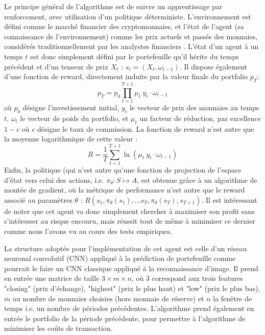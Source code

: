 \documentclass[a4paper, 10pt]{article}
\begin{document}
Le principe général de l'algorithme est de suivre un apprentissage par renforcement, avec utilisation d'un politique déterministe. L'environnement est défini comme le marché financier des cryptomonnaies, et l'état de l'agent (sa connaissance de l'environnement) comme les prix actuels et passés des monnaies, considérés traditionnellement par les analystes financiers \cite{Lo2000}. L'état d'un agent à un temps $t$ est donc simplement défini par le portefeuille qu'il hérite du temps précédent et d'un tenseur de prix $X_t$ : $s_t = (X_t, \omega_{t-1})$. Il dispose également d'une fonction de reward, directement induite par la valeur finale du portfolio $p_T$:
\begin{equation}
    p_T = p_0 \prod_{t=1}^{T+1} \mu_t \ y_t \cdot \omega_{t-1}
\label{eq:valeur_finale}
\end{equation}
où $p_0$ désigne l'investissement initial, $y_t$ le vecteur de prix des monnaies au temps $t$, $\omega_t$ le vecteur de poids du portfolio, et $\mu_t$ un facteur de réduction, par excellence $1 - c$ où $c$ désigne le taux de commission. La fonction de reward n'est autre que la moyenne logarithmique de cette valeur :
\begin{equation}
    R = \frac{1}{T} \sum_{t=1}^{T+1} \ln(\mu_t \ y_t \cdot \omega_{t-1})
\end{equation}
Enfin, la politique (qui n'est autre qu'une fonction de projection de l'espace d'état vers celui des actions, i.e. $\pi_{\theta} : S \mapsto A$, est obtenue grâce à un algorithme de montée de gradient, où la  métrique de performance n'est autre que le reward associé au paramètres $\theta$ : $R(s_1, \pi_{\theta} (s_1), ...s_T, \pi_{\theta} (s_T), s_{T+1})$. Il est intéressant de noter que cet agent va donc simplement chercher à maximiser son profit sans s'intéresser au risque encouru, mais réussit tout de même à minimiser ce dernier comme nous l'avons vu au cours des tests empiriques.

La structure adoptée pour l'implémentation de cet agent est celle d'un réseau neuronal convolutif (CNN) appliqué à la prédiction de portefeuille comme pourrait le faire un CNN classique appliqué à la reconnaissance d'image. Il prend en entrée une matrice de taille $3 \times m \times n$, où 3 correspond aux trois features "closing" (prix d'échange), "highest" (prix le plus haut) et "low" (prix le plus bas), $m$ au nombre de monnaies choisies (hors monnaie de réserve) et $n$ la fenêtre de temps i.e. un nombre de périodes précédentes. L'algorithme prend également en entrée le portfolio de la période précédente, pour permettre à l'algorithme de minimiser les coûts de transaction.
\end{document}
